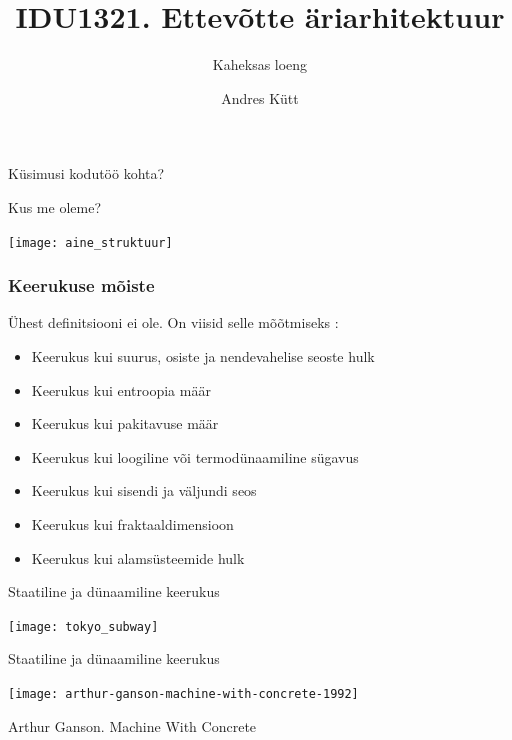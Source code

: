 \documentclass{beamer}
\title{IDU1321. Ettevõtte äriarhitektuur}
\subtitle{Kaheksas loeng}
\author{Andres Kütt}
\institute{Arhitekt}
\begin{document}
\begin{frame}
\titlepage
\end{frame}


\begin{frame}[standout]
Küsimusi kodutöö kohta?
\end{frame}


\begin{frame}{Kus me oleme?}
	\begin{center}
		\texttt{[image: aine\_struktuur]}
	\end{center}
\end{frame}

\begin{frame}[fragile]
  \frametitle{Keerukuse mõiste}
  Ühest definitsiooni ei ole. On viisid selle mõõtmiseks \cite{mitchell2009complexity}:
	\begin{itemize}
		\item Keerukus kui suurus, osiste ja nendevahelise seoste hulk
		\item Keerukus kui entroopia määr
		\item Keerukus kui pakitavuse määr
		\item Keerukus kui loogiline või termodünaamiline sügavus
		\item Keerukus kui sisendi ja väljundi seos
		\item Keerukus kui fraktaaldimensioon
		\item Keerukus kui alamsüsteemide hulk
		
	\end{itemize}
\end{frame}

\begin{frame}{Staatiline ja dünaamiline keerukus}
	\begin{center}
		\texttt{[image: tokyo\_subway]}
	\end{center}
\end{frame}

\begin{frame}{Staatiline ja dünaamiline keerukus}
	\begin{center}
		\texttt{[image: arthur-ganson-machine-with-concrete-1992]}
	\end{center}
Arthur Ganson. Machine With Concrete
\end{frame}
\end{document}
